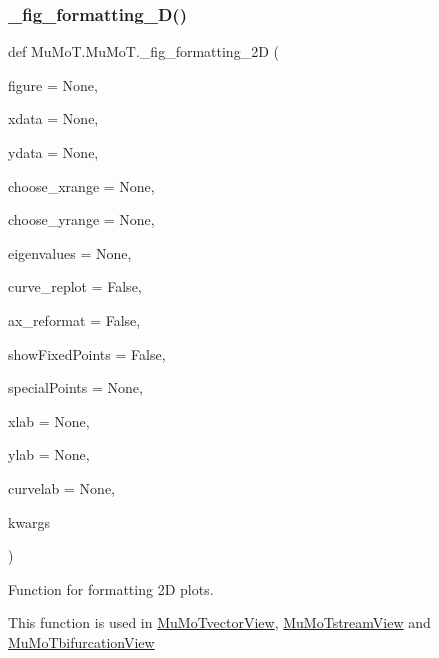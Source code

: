 \subsubsection{\texorpdfstring{\+\_\+fig\+\_\+formatting\+\_\+D()}{\_fig\_formatting\_2D()}}
{\footnotesize\ttfamily def Mu\+Mo\+T.\+Mu\+Mo\+T.\+\_\+fig\+\_\+formatting\+\_\+2D (\begin{DoxyParamCaption}\item[{}]{figure = {\ttfamily None},  }\item[{}]{xdata = {\ttfamily None},  }\item[{}]{ydata = {\ttfamily None},  }\item[{}]{choose\+\_\+xrange = {\ttfamily None},  }\item[{}]{choose\+\_\+yrange = {\ttfamily None},  }\item[{}]{eigenvalues = {\ttfamily None},  }\item[{}]{curve\+\_\+replot = {\ttfamily False},  }\item[{}]{ax\+\_\+reformat = {\ttfamily False},  }\item[{}]{show\+Fixed\+Points = {\ttfamily False},  }\item[{}]{special\+Points = {\ttfamily None},  }\item[{}]{xlab = {\ttfamily None},  }\item[{}]{ylab = {\ttfamily None},  }\item[{}]{curvelab = {\ttfamily None},  }\item[{}]{kwargs }\end{DoxyParamCaption})\hspace{0.3cm}{\ttfamily [private]}}



Function for formatting 2D plots. 

This function is used in \hyperlink{class_mu_mo_t_1_1_mu_mo_t_1_1_mu_mo_tvector_view}{Mu\+Mo\+Tvector\+View}, \hyperlink{class_mu_mo_t_1_1_mu_mo_t_1_1_mu_mo_tstream_view}{Mu\+Mo\+Tstream\+View} and \hyperlink{class_mu_mo_t_1_1_mu_mo_t_1_1_mu_mo_tbifurcation_view}{Mu\+Mo\+Tbifurcation\+View} \mbox{\label{namespace_mu_mo_t_1_1_mu_mo_t_a2748e3bdfa70e8269681135256afc7b5}} 
